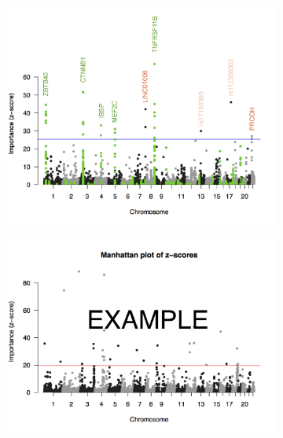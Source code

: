 \documentclass[10pt,letterpaper]{article}
\begin{document}
\begin{figure}[tbhp]
  \begin{adjustwidth}{-2.00in}{0in}
    \caption{\textbf{Genome-wide importance of SNPs for Bone Mineral Density association}}
    \label{figure:ranksumtest}
     \begin{subfigure}[b]{0.5\linewidth}
     \includegraphics[totalheight=7cm]{./figs/BMDTopWholeGenome_annotated.png}
      \label{figure:BMDTopWholeGenome} 
    \end{subfigure} 
 \begin{subfigure}[b]{0.5\linewidth}
      \centering
      \includegraphics[totalheight=7cm]{./figs/BMDTopWholeGenome_BW_random.png}
      \label{zoomplotTNFRSF} 

\end{subfigure}
\end{adjustwidth}
\end{figure}
\end{document}
